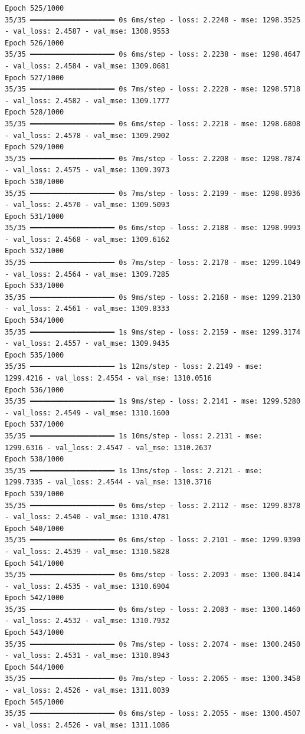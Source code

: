 \documentclass[
  letterpaper,
  DIV=11,
  numbers=noendperiod]{scrreprt}
\begin{document}
\begin{verbatim}
Epoch 525/1000
35/35 ━━━━━━━━━━━━━━━━━━━━ 0s 6ms/step - loss: 2.2248 - mse: 1298.3525 - val_loss: 2.4587 - val_mse: 1308.9553
Epoch 526/1000
35/35 ━━━━━━━━━━━━━━━━━━━━ 0s 6ms/step - loss: 2.2238 - mse: 1298.4647 - val_loss: 2.4584 - val_mse: 1309.0681
Epoch 527/1000
35/35 ━━━━━━━━━━━━━━━━━━━━ 0s 7ms/step - loss: 2.2228 - mse: 1298.5718 - val_loss: 2.4582 - val_mse: 1309.1777
Epoch 528/1000
35/35 ━━━━━━━━━━━━━━━━━━━━ 0s 6ms/step - loss: 2.2218 - mse: 1298.6808 - val_loss: 2.4578 - val_mse: 1309.2902
Epoch 529/1000
35/35 ━━━━━━━━━━━━━━━━━━━━ 0s 7ms/step - loss: 2.2208 - mse: 1298.7874 - val_loss: 2.4575 - val_mse: 1309.3973
Epoch 530/1000
35/35 ━━━━━━━━━━━━━━━━━━━━ 0s 7ms/step - loss: 2.2199 - mse: 1298.8936 - val_loss: 2.4570 - val_mse: 1309.5093
Epoch 531/1000
35/35 ━━━━━━━━━━━━━━━━━━━━ 0s 6ms/step - loss: 2.2188 - mse: 1298.9993 - val_loss: 2.4568 - val_mse: 1309.6162
Epoch 532/1000
35/35 ━━━━━━━━━━━━━━━━━━━━ 0s 7ms/step - loss: 2.2178 - mse: 1299.1049 - val_loss: 2.4564 - val_mse: 1309.7285
Epoch 533/1000
35/35 ━━━━━━━━━━━━━━━━━━━━ 0s 9ms/step - loss: 2.2168 - mse: 1299.2130 - val_loss: 2.4561 - val_mse: 1309.8333
Epoch 534/1000
35/35 ━━━━━━━━━━━━━━━━━━━━ 1s 9ms/step - loss: 2.2159 - mse: 1299.3174 - val_loss: 2.4557 - val_mse: 1309.9435
Epoch 535/1000
35/35 ━━━━━━━━━━━━━━━━━━━━ 1s 12ms/step - loss: 2.2149 - mse: 1299.4216 - val_loss: 2.4554 - val_mse: 1310.0516
Epoch 536/1000
35/35 ━━━━━━━━━━━━━━━━━━━━ 1s 9ms/step - loss: 2.2141 - mse: 1299.5280 - val_loss: 2.4549 - val_mse: 1310.1600
Epoch 537/1000
35/35 ━━━━━━━━━━━━━━━━━━━━ 1s 10ms/step - loss: 2.2131 - mse: 1299.6316 - val_loss: 2.4547 - val_mse: 1310.2637
Epoch 538/1000
35/35 ━━━━━━━━━━━━━━━━━━━━ 1s 13ms/step - loss: 2.2121 - mse: 1299.7335 - val_loss: 2.4544 - val_mse: 1310.3716
Epoch 539/1000
35/35 ━━━━━━━━━━━━━━━━━━━━ 0s 6ms/step - loss: 2.2112 - mse: 1299.8378 - val_loss: 2.4540 - val_mse: 1310.4781
Epoch 540/1000
35/35 ━━━━━━━━━━━━━━━━━━━━ 0s 6ms/step - loss: 2.2101 - mse: 1299.9390 - val_loss: 2.4539 - val_mse: 1310.5828
Epoch 541/1000
35/35 ━━━━━━━━━━━━━━━━━━━━ 0s 6ms/step - loss: 2.2093 - mse: 1300.0414 - val_loss: 2.4535 - val_mse: 1310.6904
Epoch 542/1000
35/35 ━━━━━━━━━━━━━━━━━━━━ 0s 6ms/step - loss: 2.2083 - mse: 1300.1460 - val_loss: 2.4532 - val_mse: 1310.7932
Epoch 543/1000
35/35 ━━━━━━━━━━━━━━━━━━━━ 0s 7ms/step - loss: 2.2074 - mse: 1300.2450 - val_loss: 2.4531 - val_mse: 1310.8943
Epoch 544/1000
35/35 ━━━━━━━━━━━━━━━━━━━━ 0s 7ms/step - loss: 2.2065 - mse: 1300.3458 - val_loss: 2.4526 - val_mse: 1311.0039
Epoch 545/1000
35/35 ━━━━━━━━━━━━━━━━━━━━ 0s 6ms/step - loss: 2.2055 - mse: 1300.4507 - val_loss: 2.4526 - val_mse: 1311.1086

\end{verbatim}
\end{document}
